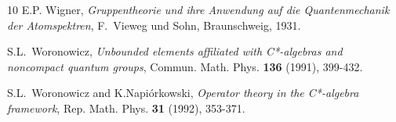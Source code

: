 \documentclass[a4paper,12pt]{amsart}
\newcommand{\1}{\mathbb{I}}
\numberwithin{equation}{section}
\numberwithin{theorem}{section}
\begin{document}
\begin{thebibliography}{10}
{\sc E.P. Wigner}, {\em Gruppentheorie und ihre Anwendung auf die Quantenmechanik der
  Atomspektren}, F.~Vieweg und Sohn, Braunschweig, 1931.

{\sc S.L.~Woronowicz},
{\em Unbounded elements affiliated with C*-algebras and noncompact quantum groups},
Commun. Math. Phys. {\bf 136} (1991), 399-432.

{\sc S.L.~Woronowicz and K.Napi\'orkowski},
{\em Operator theory in the C*-algebra framework},
Rep. Math. Phys. {\bf 31} (1992), 353-371.

\end{thebibliography}
\end{document}
